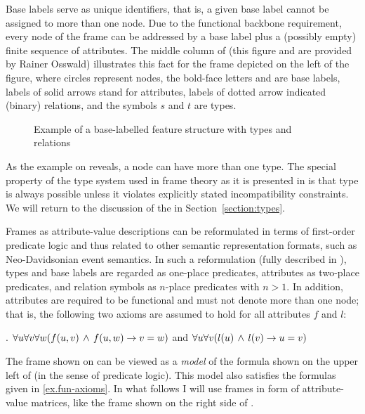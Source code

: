 Base labels serve as unique identifiers, that is, a given base label cannot be assigned to more than one node. Due to the functional backbone requirement, every node of the frame can be addressed by a base label
plus a (possibly empty) finite sequence of attributes.
The middle column of  (this figure and  are provided by Rainer Osswald) illustrates this fact
for the frame depicted on the left of the figure, where circles
represent nodes, the bold-face letters  and  are base
labels, labels of solid arrows stand for attributes, labels of dotted arrow
indicated (binary) relations, and the symbols $s$ and $t$ are types.\largerpage

\begin{figure}
%
\caption{Example of a base-labelled feature structure with types and relations\label{fig-frame-example}}
\end{figure}

As the example on  reveals, a node can have more than one type. The special property of the type system used in frame theory as it is presented in \citealt{KallmeyerOsswald:13} is that type  is always possible unless it violates explicitly stated incompatibility constraints. We will return to the discussion of the  in Section~\ref{section:types}.

Frames as attribute-value descriptions can be reformulated in terms of first-order predicate logic and thus related to other semantic representation formats, such as Neo-Davidsonian event semantics. In such a reformulation (fully described in \citealt[Section~3.3.3]{KallmeyerOsswald:13}), types and base
labels are regarded as one-place predicates, attributes as two-place predicates, and relation symbols as $n$-place predicates with $n>1$.
In addition, attributes are required to be functional and  must
not denote more than one node;
that is, the following two axioms are assumed to hold for all
attributes $f$ and  $l$:

\ex.\label{ex.fun-axioms}
$\forall u\forall v\forall w(f(u,v)\,\wedge\, f(u,w)\rightarrow v=w)$
\quad and \quad
$\forall u\forall v(l(u)\,\wedge\, l(v)\rightarrow u=v)$

The frame shown on  can be viewed
as a \emph{model} of the formula shown on the upper left of  (in the sense of predicate logic). This model also satisfies the formulas given in \ref{ex.fun-axioms}. In what follows I will use frames in form of attribute-value matrices, like the frame shown on the right side of .


